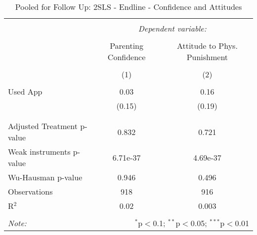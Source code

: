 
\begin{table}[!htbp] \centering 
  \caption{Pooled for Follow Up: 2SLS - Endline - Confidence and Attitudes} 
  \label{tbl:Pooled for Follow Up: 2SLS - Endline - Confidence and Attitudes} 
\begin{tabular}{@{\extracolsep{5pt}}lcc} 
\\[-1.8ex]\hline 
\hline \\[-1.8ex] 
 & \multicolumn{2}{c}{\textit{Dependent variable:}} \\ 
\cline{2-3} 
\\[-1.8ex] & Parenting Confidence & Attitude to Phys. Punishment \\ 
\\[-1.8ex] & (1) & (2)\\ 
\hline \\[-1.8ex] 
 Used App & 0.03 & 0.16 \\ 
  & (0.15) & (0.19) \\ 
  & & \\ 
\hline \\[-1.8ex] 
Adjusted Treatment p-value & 0.832 & 0.721 \\ 
Weak instruments p-value & 6.71e-37 & 4.69e-37 \\ 
Wu-Hausman p-value & 0.946 & 0.496 \\ 
Observations & 918 & 916 \\ 
R$^{2}$ & 0.02 & 0.003 \\ 
\hline 
\hline \\[-1.8ex] 
\textit{Note:}  & \multicolumn{2}{r}{$^{*}$p$<$0.1; $^{**}$p$<$0.05; $^{***}$p$<$0.01} \\ 
\end{tabular} 
\end{table} 
